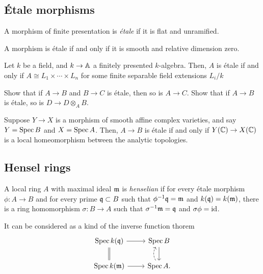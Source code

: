 \documentclass{../../../small}
\begin{document}
\subsection{\'Etale morphisms}
\begin{defn*}
A morphism of finite presentation is \emph{\'etale} if it is flat and unramified.
\end{defn*}
\begin{rmk*}
A morphism is \'etale if and only if it is smooth and relative dimension zero.
\end{rmk*}
\begin{ex*}
Let $k$ be a field, and $k\to\mathbb{A}$ a finitely presented $k$-algebra.
Then, $A$ is \'etale if and only if $A\cong L_1\times\cdots\times L_n$ for some finite separable field extensions $L_i/k$
\end{ex*}

\begin{exe*}
Show that if $A\to B$ and $B\to C$ is \'etale, then so is $A\to C$.
Show that if $A\to B$ is \'etale, so is $D\to D\otimes_AB$.
\end{exe*}
\begin{ex*}
Suppose $Y\to X$ is a morphism of smooth affine complex varieties, and say $Y=\operatorname{Spec} B$ and $X=\operatorname{Spec} A$.
Then, $A\to B$ is \'etale if and only if $Y(\mathbb{C})\to X(\mathbb{C})$ is a local homeomorphism between the analytic topologies.
\end{ex*}

\subsection{Hensel rings}
\begin{defn*}
A local ring $A$ with maximal ideal $\mathfrak{m}$ is \emph{henselian} if for every \'etale morphism $\phi:A\to B$ and for every prime $\mathfrak{q}\subset B$ such that $\phi^{-1}\mathfrak{q}=\mathfrak{m}$ and $k(\mathfrak{q})=k(\mathfrak{m})$, there is a ring homomorphism $\sigma:B\to A$ such that $\sigma^{-1}\mathfrak{m}=\mathfrak{q}$ and $\sigma\phi=\operatorname{id}$.

It can be considered as a kind of the inverse function thorem
\[\begin{tikzcd}
\Spec k(\fq) \rar\dar[equal] & \Spec B\dar\\
\Spec k(\fm) \rar & \Spec A\uar[bend left, dashed].
\end{tikzcd}\]
\end{defn*}
\end{document}
